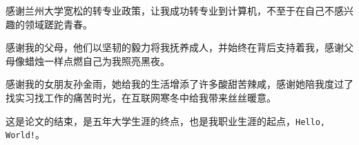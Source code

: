 \documentclass[AutoFakeBold]{LZUThesis}
\begin{document}
\begin{sloppypar}
感谢兰州大学宽松的转专业政策，让我成功转专业到计算机，不至于在自己不感兴趣的领域蹉跎青春。

感谢我的父母，他们以坚韧的毅力将我抚养成人，并始终在背后支持着我，感谢父母像蜡烛一样点燃自己为我照亮黑夜。

感谢我的女朋友孙金雨，她给我的生活增添了许多酸甜苦辣咸，感谢她陪我度过了找实习找工作的痛苦时光，在互联网寒冬中给我带来丝丝暖意。

这是论文的结束，是五年大学生涯的终点，也是我职业生涯的起点，\texttt{Hello, World!}。

\Grade %

\end{sloppypar}
\end{document}
